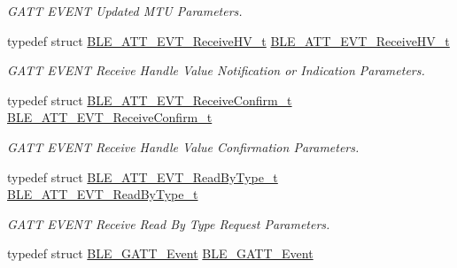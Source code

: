 \begin{DoxyCompactItemize}
\begin{DoxyCompactList}\small\item\em G\+A\+TT E\+V\+E\+NT Updated M\+TU Parameters. \end{DoxyCompactList}\item 
typedef struct \hyperlink{struct_b_l_e___a_t_t___e_v_t___receive_h_v__t}{B\+L\+E\+\_\+\+A\+T\+T\+\_\+\+E\+V\+T\+\_\+\+Receive\+H\+V\+\_\+t} \hyperlink{group___b_l_e___g_a_t_t_ga7b926a7fdc4ee6a623019c30c536ba4f}{B\+L\+E\+\_\+\+A\+T\+T\+\_\+\+E\+V\+T\+\_\+\+Receive\+H\+V\+\_\+t}\hypertarget{group___b_l_e___g_a_t_t_ga7b926a7fdc4ee6a623019c30c536ba4f}{}\label{group___b_l_e___g_a_t_t_ga7b926a7fdc4ee6a623019c30c536ba4f}

\begin{DoxyCompactList}\small\item\em G\+A\+TT E\+V\+E\+NT Receive Handle Value Notification or Indication Parameters. \end{DoxyCompactList}\item 
typedef struct \hyperlink{struct_b_l_e___a_t_t___e_v_t___receive_confirm__t}{B\+L\+E\+\_\+\+A\+T\+T\+\_\+\+E\+V\+T\+\_\+\+Receive\+Confirm\+\_\+t} \hyperlink{group___b_l_e___g_a_t_t_ga9a54a03fd14610243a6d51b51837556d}{B\+L\+E\+\_\+\+A\+T\+T\+\_\+\+E\+V\+T\+\_\+\+Receive\+Confirm\+\_\+t}\hypertarget{group___b_l_e___g_a_t_t_ga9a54a03fd14610243a6d51b51837556d}{}\label{group___b_l_e___g_a_t_t_ga9a54a03fd14610243a6d51b51837556d}

\begin{DoxyCompactList}\small\item\em G\+A\+TT E\+V\+E\+NT Receive Handle Value Confirmation Parameters. \end{DoxyCompactList}\item 
typedef struct \hyperlink{struct_b_l_e___a_t_t___e_v_t___read_by_type__t}{B\+L\+E\+\_\+\+A\+T\+T\+\_\+\+E\+V\+T\+\_\+\+Read\+By\+Type\+\_\+t} \hyperlink{group___b_l_e___g_a_t_t_ga9cfa75f09b14683afdd4def5cbc15be8}{B\+L\+E\+\_\+\+A\+T\+T\+\_\+\+E\+V\+T\+\_\+\+Read\+By\+Type\+\_\+t}\hypertarget{group___b_l_e___g_a_t_t_ga9cfa75f09b14683afdd4def5cbc15be8}{}\label{group___b_l_e___g_a_t_t_ga9cfa75f09b14683afdd4def5cbc15be8}

\begin{DoxyCompactList}\small\item\em G\+A\+TT E\+V\+E\+NT Receive Read By Type Request Parameters. \end{DoxyCompactList}\item 
typedef struct \hyperlink{struct_b_l_e___g_a_t_t___event}{B\+L\+E\+\_\+\+G\+A\+T\+T\+\_\+\+Event} \hyperlink{group___b_l_e___g_a_t_t_ga4eda93282685fc60561bed8c9e88f449}{B\+L\+E\+\_\+\+G\+A\+T\+T\+\_\+\+Event}\hypertarget{group___b_l_e___g_a_t_t_ga4eda93282685fc60561bed8c9e88f449}{}\label{group___b_l_e___g_a_t_t_ga4eda93282685fc60561bed8c9e88f449}


\end{DoxyCompactItemize}

